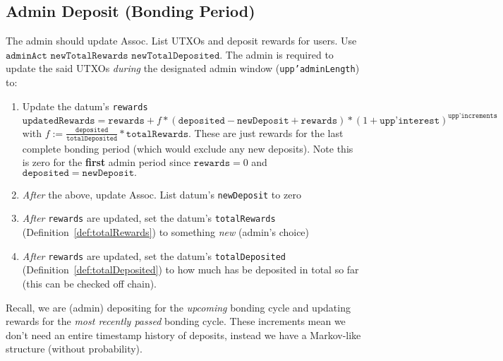 \documentclass[10pt, a4paper]{article}
\theoremstyle{definition}
\begin{document}
\subsection{Admin Deposit (Bonding Period)}\label{subsection:adminDeposit}
The admin should update Assoc. List UTXOs and deposit rewards for users. Use \\ $\texttt{adminAct newTotalRewards newTotalDeposited}$.  The admin is required to update the said UTXOs \textit{during} the designated admin window (\texttt{upp'adminLength}) to:
\begin{enumerate}
\item{Update the datum's \texttt{rewards} $\texttt{updatedRewards} = \texttt{rewards} + f *(\texttt{deposited} - \texttt{newDeposit} + \texttt{rewards})* (1 + \texttt{upp'interest})^\texttt{upp'increments}$ with $f := \frac{\texttt{deposited}}{\texttt{totalDeposited}} * \texttt{totalRewards}$. These are just rewards for the last complete bonding period (which would exclude any new deposits). Note this is zero for the \textbf{first} admin period since $\texttt{rewards}=0$ and $\texttt{deposited} = \texttt{newDeposit}.$}
\item{\textit{After} the above, update Assoc. List datum's \texttt{newDeposit} to zero}
\item{\textit{After} \texttt{rewards} are updated, set the datum's \texttt{totalRewards} (Definition~\ref{def:totalRewards}) to something \textit{new} (admin's choice)}
\item{\textit{After} \texttt{rewards} are updated, set the datum's \texttt{totalDeposited} (Definition~\ref{def:totalDeposited}) to how much has be deposited in total so far (this can be checked off chain).}

\end{enumerate}

Recall, we are (admin) depositing for the \textit{upcoming} bonding cycle and updating rewards for the \textit{most recently passed} bonding cycle. These increments mean we don't need an entire timestamp history of deposits, instead we have a Markov-like structure (without probability).
\end{document}
